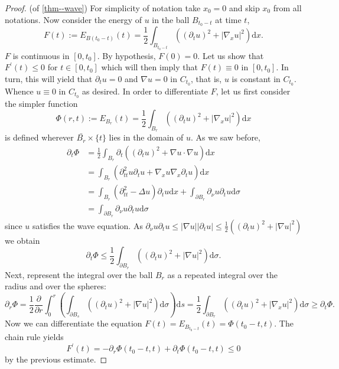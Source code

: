 \documentclass[11pt]{article}
\begin{document}
				\begin{proof}(of \autoref{thm--wave})
					For simplicity of notation take $x_0=0$ and skip $x_0$ from all notations. Now consider the energy of $u$ in the ball $B_{t_0-t}$ at time $t$,
					\begin{equation*}
						F(t):=E_{B(t_0-t)}(t)=\frac{1}{2}\int_{B_{t_0-t}}\left((\partial_t u)^2+|\nabla_x u|^2\right)\mathrm{d}x.
					\end{equation*}
					$F$ is continuous in $[0,t_0]$. By hypothesis, $F(0)=0$. Let us show that $F^\prime(t)\le0$ for $t\in[0,t_0]$ which will then imply that $F(t)\equiv0$ in $[0,t_0]$. In turn, this will yield that $\partial_t u=0$ and $\nabla u=0$ in $C_{t_0}$, that is, $u$ is constant in $C_{t_0}$. Whence $u\equiv0$ in $C_{t_0}$ as desired. In order to differentiate $F$, let us first consider the simpler function
					\begin{equation*}
						\Phi(r,t):=E_{B_r}(t)=\frac{1}{2}\int_{B_r}\left((\partial_t u)^2+|\nabla_x u|^2\right)\mathrm{d}x
					\end{equation*}
					is defined wherever $\bar{B_r}\times\{t\}$ lies in the domain of $u$. As we saw before,
					\begin{align*}
						\partial_t\Phi&=\frac{1}{2}\int_{B_r}\partial_t\left((\partial_t u)^2+\nabla u\cdot\nabla u\right)\mathrm{d}x\\
						&=\int_{B_r}\left(\partial_{tt}^2u\partial_t u+\nabla_x u\nabla_x\partial_t u\right)\mathrm{d}x\\
						&=\int_{B_r}\left(\partial_{tt}^2-\Delta u\right)\partial_t u\mathrm{d}x+\int_{\partial B_r}\partial_\nu u\partial_t u \mathrm{d}\sigma\\
						&=\int_{\partial B_r}\partial_\nu u\partial_t u \mathrm{d}\sigma
					\end{align*}
					since $u$ satisfies the wave equation. As $\partial_\nu u\partial_t u\le|\nabla u||\partial_t u|\le\frac{1}{2}\left((\partial_tu)^2+|\nabla u|^2\right)$ we obtain
					\begin{equation*}
						\partial_t\Phi\le\frac{1}{2}\int_{\partial B_r}\left((\partial_tu)^2+|\nabla u|^2\right)\mathrm{d}\sigma.
					\end{equation*}
					Next, represent the integral over the ball $B_r$ as a repeated integral over the radius and over the spheres:
					\begin{equation*}
						\partial_r\Phi=\frac{1}{2}\frac{\partial}{\partial r}\int_0^r\left(\int_{\partial B_s}\left((\partial_t u)^2+|\nabla u|^2\right)\mathrm{d}\sigma\right)\mathrm{d}s=\frac{1}{2}\int_{\partial B_r}\left((\partial_t u)^2+|\nabla_xu|^2\right)\mathrm{d}\sigma\ge\partial_t\Phi.
					\end{equation*}
					Now we can differentiate the equation $F(t)=E_{B_{t_0-t}}(t)=\Phi(t_0-t,t)$. The chain rule yields
					\begin{equation*}
						F^\prime(t)=-\partial_r\Phi(t_0-t,t)+\partial_t\Phi(t_0-t,t)\le0
					\end{equation*}
					by the previous estimate.
				\end{proof}
\end{document}
